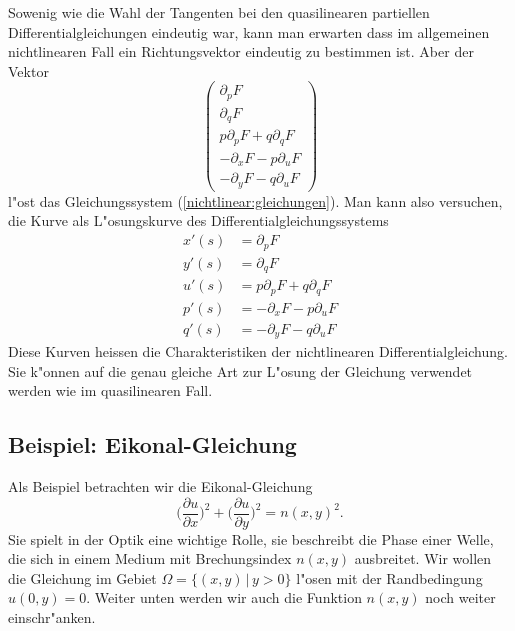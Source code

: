 Sowenig wie die Wahl der Tangenten bei den quasilinearen partiellen
Differentialgleichungen eindeutig war, kann man erwarten dass im
allgemeinen nichtlinearen Fall ein Richtungsvektor eindeutig zu
bestimmen ist. Aber der Vektor 
\[
\begin{pmatrix}
\partial_pF\\
\partial_qF\\
p\partial_pF+q\partial_qF\\
-\partial_xF-p\partial_uF\\
-\partial_yF-q\partial_uF
\end{pmatrix}
\]
l"ost das Gleichungssystem (\ref{nichtlinear:gleichungen}).
Man kann also versuchen, die Kurve als L"osungskurve des
Differentialgleichungssystems
\begin{align*}
x'(s)
&=
\partial_pF
\\
y'(s)
&=
\partial_qF
\\
u'(s)
&=
p\partial_pF+q\partial_qF
\\
p'(s)
&=
-\partial_xF-p\partial_uF
\\
q'(s)
&=
-\partial_yF-q\partial_uF
\end{align*}
Diese Kurven heissen die Charakteristiken der nichtlinearen
Differentialgleichung.
Sie k"onnen auf die genau gleiche Art zur L"osung der Gleichung
verwendet werden wie im quasilinearen Fall.

\subsection{Beispiel: Eikonal-Gleichung}
Als Beispiel betrachten wir die Eikonal-Gleichung 
\[
\biggl(\frac{\partial u}{\partial x}\biggr)^2
+
\biggl(\frac{\partial u}{\partial y}\biggr)^2
=
n(x,y)^2.
\]
Sie spielt in der Optik eine wichtige Rolle, sie beschreibt die
Phase einer Welle, die sich in einem Medium mit Brechungsindex $n(x,y)$
ausbreitet. Wir wollen die Gleichung im Gebiet $\Omega=\{(x,y)\,|\,y>0\}$
l"osen mit der Randbedingung $u(0,y)=0$. Weiter unten werden wir auch 
die Funktion $n(x,y)$ noch weiter einschr"anken.

